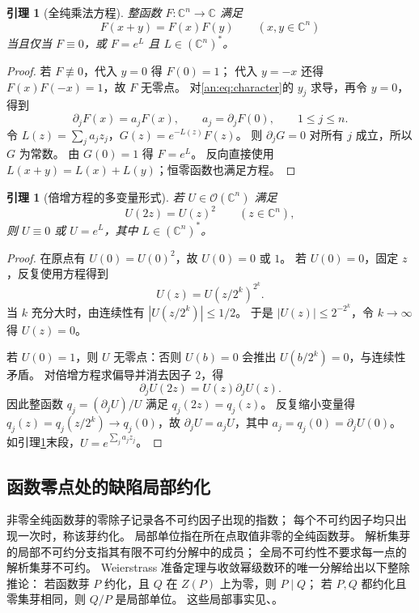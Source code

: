 \documentclass[11pt,a4paper,oneside,openany]{book}
\theoremstyle{lecture}
\newtheorem{lemma}[theorem]{引理}
\newcommand{\C}{\mathbb C}
\newcommand{\OO}{\mathcal O}
\newcommand{\e}{e}
\numberwithin{equation}{section}
\begin{document}
\begin{lemma}[全纯乘法方程]\label{an:lem:character}
整函数 $F:\C^n\to\C$ 满足
\begin{equation}\label{an:eq:character}
 F(x+y)=F(x)F(y)\qquad(x,y\in\C^n)
\end{equation}
当且仅当 $F\equiv0$，或 $F=\e^L$ 且 $L\in(\C^n)^*$。
\end{lemma}
\begin{proof}
若 $F\not\equiv0$，代入 $y=0$ 得 $F(0)=1$；
代入 $y=-x$ 还得 $F(x)F(-x)=1$，故 $F$ 无零点。
对\eqref{an:eq:character}的 $y_j$ 求导，再令 $y=0$，得到
\[
 \partial_jF(x)=a_jF(x),\qquad a_j=\partial_jF(0),
 \qquad 1\leq j\leq n.
\]
令 $L(z)=\sum_j a_jz_j$，$G(z)=\e^{-L(z)}F(z)$。
则 $\partial_jG=0$ 对所有 $j$ 成立，所以 $G$ 为常数。
由 $G(0)=1$ 得 $F=\e^L$。
反向直接使用 $L(x+y)=L(x)+L(y)$；恒零函数也满足方程。
\end{proof}

\begin{lemma}[倍增方程的多变量形式]\label{an:lem:dilation}
若 $U\in\OO(\C^n)$ 满足
\[
 U(2z)=U(z)^2\qquad(z\in\C^n),
\]
则 $U\equiv0$ 或 $U=\e^L$，其中 $L\in(\C^n)^*$。
\end{lemma}
\begin{proof}
在原点有 $U(0)=U(0)^2$，故 $U(0)=0$ 或 $1$。
若 $U(0)=0$，固定 $z$，反复使用方程得到
\[
 U(z)=U(z/2^k)^{2^k}.
\]
当 $k$ 充分大时，由连续性有 $|U(z/2^k)|\leq1/2$。
于是 $|U(z)|\leq2^{-2^k}$，令 $k\to\infty$ 得 $U(z)=0$。

若 $U(0)=1$，则 $U$ 无零点：否则 $U(b)=0$ 会推出
$U(b/2^k)=0$，与连续性矛盾。
对倍增方程求偏导并消去因子 $2$，得
\[
 \partial_jU(2z)=U(z)\partial_jU(z).
\]
因此整函数 $q_j=(\partial_jU)/U$ 满足 $q_j(2z)=q_j(z)$。
反复缩小变量得 $q_j(z)=q_j(z/2^k)\to q_j(0)$，故
$\partial_jU=a_jU$，其中 $a_j=q_j(0)=\partial_jU(0)$。
如引理\ref{an:lem:character}末段，$U=\e^{\sum_j a_jz_j}$。
\end{proof}

\subsection{函数零点处的缺陷局部约化}
非零全纯函数芽的零除子记录各不可约因子出现的指数；
每个不可约因子均只出现一次时，称该芽约化。
局部单位指在所在点取值非零的全纯函数芽。
解析集芽的局部不可约分支指其有限不可约分解中的成员；
全局不可约性不要求每一点的解析集芽不可约。
Weierstrass 准备定理与收敛幂级数环的唯一分解给出以下整除推论：
若函数芽 $P$ 约化，且 $Q$ 在 $Z(P)$ 上为零，则 $P\mid Q$；
若 $P,Q$ 都约化且零集芽相同，则 $Q/P$ 是局部单位。
这些局部事实见\cite[\S\,5.5--5.8]{glutsyuk}、\cite[\S\S6.2,6.4,6.6]{lebl}。
\end{document}
